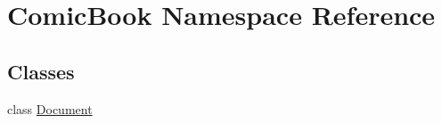 \hypertarget{namespaceComicBook}{\section{Comic\+Book Namespace Reference}
\label{namespaceComicBook}
}
\subsection*{Classes}
\begin{DoxyCompactItemize}
\item 
class \hyperlink{classComicBook_1_1Document}{Document}
\end{DoxyCompactItemize}
